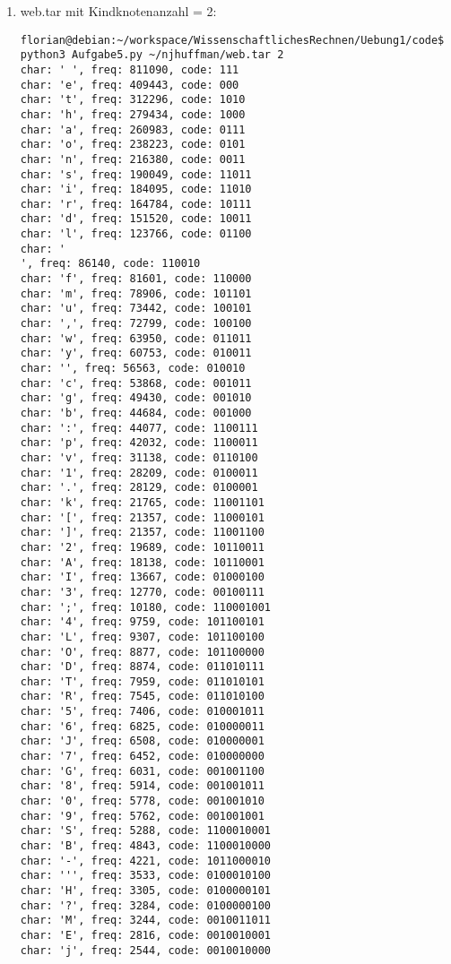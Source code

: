 \documentclass[11pt]{article} %
\theoremstyle{definition}
\begin{document}
\begin{enumerate}[(1)]

\item web.tar mit Kindknotenanzahl = 2:
\begin{verbatim}
florian@debian:~/workspace/WissenschaftlichesRechnen/Uebung1/code$ python3 Aufgabe5.py ~/njhuffman/web.tar 2
char: ' ', freq: 811090, code: 111
char: 'e', freq: 409443, code: 000
char: 't', freq: 312296, code: 1010
char: 'h', freq: 279434, code: 1000
char: 'a', freq: 260983, code: 0111
char: 'o', freq: 238223, code: 0101
char: 'n', freq: 216380, code: 0011
char: 's', freq: 190049, code: 11011
char: 'i', freq: 184095, code: 11010
char: 'r', freq: 164784, code: 10111
char: 'd', freq: 151520, code: 10011
char: 'l', freq: 123766, code: 01100
char: '
', freq: 86140, code: 110010
char: 'f', freq: 81601, code: 110000
char: 'm', freq: 78906, code: 101101
char: 'u', freq: 73442, code: 100101
char: ',', freq: 72799, code: 100100
char: 'w', freq: 63950, code: 011011
char: 'y', freq: 60753, code: 010011
char: '', freq: 56563, code: 010010
char: 'c', freq: 53868, code: 001011
char: 'g', freq: 49430, code: 001010
char: 'b', freq: 44684, code: 001000
char: ':', freq: 44077, code: 1100111
char: 'p', freq: 42032, code: 1100011
char: 'v', freq: 31138, code: 0110100
char: '1', freq: 28209, code: 0100011
char: '.', freq: 28129, code: 0100001
char: 'k', freq: 21765, code: 11001101
char: '[', freq: 21357, code: 11000101
char: ']', freq: 21357, code: 11001100
char: '2', freq: 19689, code: 10110011
char: 'A', freq: 18138, code: 10110001
char: 'I', freq: 13667, code: 01000100
char: '3', freq: 12770, code: 00100111
char: ';', freq: 10180, code: 110001001
char: '4', freq: 9759, code: 101100101
char: 'L', freq: 9307, code: 101100100
char: 'O', freq: 8877, code: 101100000
char: 'D', freq: 8874, code: 011010111
char: 'T', freq: 7959, code: 011010101
char: 'R', freq: 7545, code: 011010100
char: '5', freq: 7406, code: 010001011
char: '6', freq: 6825, code: 010000011
char: 'J', freq: 6508, code: 010000001
char: '7', freq: 6452, code: 010000000
char: 'G', freq: 6031, code: 001001100
char: '8', freq: 5914, code: 001001011
char: '0', freq: 5778, code: 001001010
char: '9', freq: 5762, code: 001001001
char: 'S', freq: 5288, code: 1100010001
char: 'B', freq: 4843, code: 1100010000
char: '-', freq: 4221, code: 1011000010
char: ''', freq: 3533, code: 0100010100
char: 'H', freq: 3305, code: 0100000101
char: '?', freq: 3284, code: 0100000100
char: 'M', freq: 3244, code: 0010011011
char: 'E', freq: 2816, code: 0010010001
char: 'j', freq: 2544, code: 0010010000

\end{verbatim}
\end{enumerate}
\end{document}
